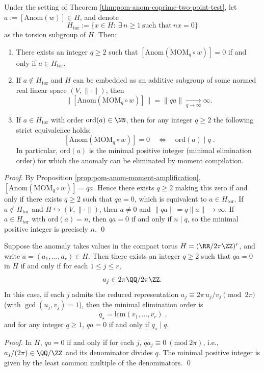 \begin{theorem}\label{thm:pom-anom-torsion-eliminability-min-order}
Under the setting of Theorem \ref{thm:pom-anom-coprime-two-point-test}, let \(a:=[\mathrm{Anom}(w)]\in H\), and denote
\[
H_{\mathrm{tor}}:=\{x\in H:\ \exists\,n\ge 1\ \text{such that}\ nx=0\}
\]
as the torsion subgroup of \(H\).
Then:
\begin{enumerate}
  \item There exists an integer \(q\ge 2\) such that \([\mathrm{Anom}(\mathrm{MOM}_q\circ w)]=0\) if and only if \(a\in H_{\mathrm{tor}}\).
  \item If \(a\notin H_{\mathrm{tor}}\) and \(H\) can be embedded as an additive subgroup of some normed real linear space \((V,\|\cdot\|)\), then
  \[
  \bigl\|[\mathrm{Anom}(\mathrm{MOM}_q\circ w)]\bigr\|
  =\|qa\|\xrightarrow[q\to\infty]{}\infty.
  \]
  \item If \(a\in H_{\mathrm{tor}}\) with order \(\mathrm{ord}(a)\in\NN\), then for any integer \(q\ge 2\) the following strict equivalence holds:
  \[
  \boxed{\;
  [\mathrm{Anom}(\mathrm{MOM}_q\circ w)]=0\quad\Longleftrightarrow\quad \mathrm{ord}(a)\mid q\; }.
  \]
  In particular, \(\mathrm{ord}(a)\) is the minimal positive integer (minimal elimination order) for which the anomaly can be eliminated by moment compilation.
\end{enumerate}
\end{theorem}
\begin{proof}
By Proposition \ref{prop:pom-anom-moment-amplification},
\(
[\mathrm{Anom}(\mathrm{MOM}_q\circ w)]=qa
\).
Hence there exists \(q\ge 2\) making this zero if and only if there exists \(q\ge 2\) such that \(qa=0\), which is equivalent to \(a\in H_{\mathrm{tor}}\).
If \(a\notin H_{\mathrm{tor}}\) and \(H\hookrightarrow (V,\|\cdot\|)\), then \(a\neq 0\) and \(\|qa\|=q\|a\|\to\infty\).
If \(a\in H_{\mathrm{tor}}\) with \(\mathrm{ord}(a)=n\), then \(qa=0\) if and only if \(n\mid q\), so the minimal positive integer is precisely \(n\). \qed
\end{proof}

\begin{corollary}\label{cor:pom-anom-torus-phase-elimination}
Suppose the anomaly takes values in the compact torus
\(
H=(\RR/2\pi\ZZ)^r
\), and write \(a=(a_1,\dots,a_r)\in H\).
Then there exists an integer \(q\ge 2\) such that \(qa=0\) in \(H\) if and only if for each \(1\le j\le r\),
\[
a_j\in 2\pi\QQ/2\pi\ZZ.
\]
In this case, if each \(j\) admits the reduced representation
\(
a_j\equiv 2\pi\,u_j/v_j\pmod{2\pi}
\) (with \(\gcd(u_j,v_j)=1\)), then the minimal elimination order is
\[
\boxed{\;
q_\star=\mathrm{lcm}(v_1,\dots,v_r)\; },
\]
and for any integer \(q\ge 1\), \(qa=0\) if and only if \(q_\star\mid q\).
\end{corollary}
\begin{proof}
In \(H\), \(qa=0\) if and only if for each \(j\), \(q a_j\equiv 0\ (\mathrm{mod}\ 2\pi)\), i.e., \(a_j/(2\pi)\in \QQ/\ZZ\) and its denominator divides \(q\).
The minimal positive integer is given by the least common multiple of the denominators. \qed
\end{proof}

